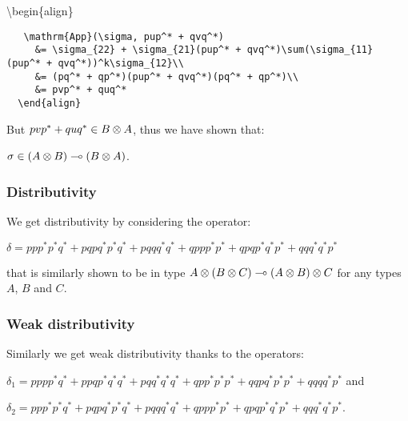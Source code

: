 \begin{description}
\tightlist
\item[]
\textbackslash{}begin\{align\}
\end{description}

\texttt{~~~\textbackslash{}mathrm\{App\}(\textbackslash{}sigma,~pup\^{}*~+~qvq\^{}*)~}\\
\texttt{~~~~~\&=~\textbackslash{}sigma\_\{22\}~+~\textbackslash{}sigma\_\{21\}(pup\^{}*~+~qvq\^{}*)\textbackslash{}sum(\textbackslash{}sigma\_\{11\}(pup\^{}*~+~qvq\^{}*))\^{}k\textbackslash{}sigma\_\{12\}\textbackslash{}\textbackslash{}}\\
\texttt{~~~~~\&=~(pq\^{}*~+~qp\^{}*)(pup\^{}*~+~qvq\^{}*)(pq\^{}*~+~qp\^{}*)\textbackslash{}\textbackslash{}}\\
\texttt{~~~~~\&=~pvp\^{}*~+~quq\^{}*}\\
\texttt{~~\textbackslash{}end\{align\}}

But \(pvp^* + quq^*\in B\otimes A\), thus we have shown that:

\begin{description}
\tightlist
\item[]
\(\sigma\in (A\otimes B) \multimap (B\otimes A)\).
\end{description}

\subsubsection{Distributivity}\label{distributivity}

We get distributivity by considering the operator:

\begin{description}
\tightlist
\item[]
\(\delta = ppp^*p^*q^* + pqpq^*p^*q^* + pqqq^*q^* + qppp^*p^* + qpqp^*q^*p^* + qqq^*q^*p^*\)
\end{description}

that is similarly shown to be in type
\(A\otimes(B\otimes C)\multimap(A\otimes B)\otimes C\) for any types \(A\), \(B\)
and \(C\).

\subsubsection{Weak distributivity}\label{weak-distributivity}

Similarly we get weak distributivity thanks to the operators:

\begin{description}
\tightlist
\item[]
\(\delta_1 = pppp^*q^* + ppqp^*q^*q^* + pqq^*q^*q^* + qpp^*p^*p^* + qqp q^*p^*p^* + qqq q^*p^*\)
and

\(\delta_2 = ppp^*p^*q^* + pqpq^*p^*q^* + pqqq^*q^* + qppp^*p^* + qpqp^*q^*p^* + qqq^*q^*p^*\).
\end{description}

